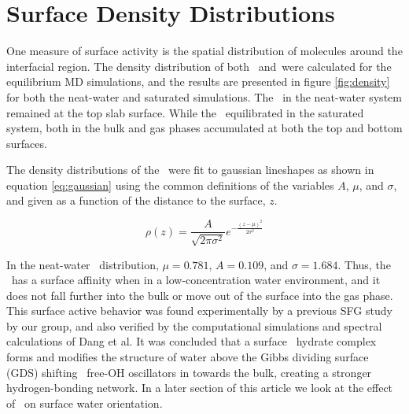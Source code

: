 \section{Surface Density Distributions}

One measure of surface activity is the spatial distribution of molecules around the interfacial region. The density distribution of both \wat~and\suldiox~were calculated for the equilibrium MD simulations, and the results are presented in figure \ref{fig:density} for both the neat-water and saturated simulations. The \suldiox~in the neat-water system remained at the top slab surface. While the \suldiox~equilibrated in the saturated system, both in the bulk and gas phases accumulated at both the top and bottom surfaces. 

The density distributions of the \suldiox~were fit to gaussian lineshapes as shown in equation \ref{eq:gaussian} using the common definitions of the variables $A$, $\mu$, and $\sigma$, and given as a function of the distance to the surface, $z$.

\begin{equation}
  \rho(z)=\frac{A}{\sqrt{2 \pi \sigma^2}} e^{-\frac{(z-\mu)^2}{2\sigma^2}}
  \label{eq:gaussian}
\end{equation}

In the neat-water \suldiox~distribution, $\mu=0.781$, $A=0.109$, and $\sigma=1.684$\angs. Thus, the \suldiox~has a surface affinity when in a low-concentration water environment, and it does not fall further into the bulk or move out of the surface into the gas phase. This surface active behavior was found experimentally by a previous SFG study by our group,\cite{Tarbuck2005,Tarbuck2006} and also verified by the computational simulations and spectral calculations of Dang et al.\cite{Baer2010} It was concluded that a surface \suldiox~hydrate complex forms and modifies the structure of water above the Gibbs dividing surface (GDS) shifting \wat~free-OH oscillators in towards the bulk, creating a stronger hydrogen-bonding network. In a later section of this article we look at the effect of \suldiox~on surface water orientation.


